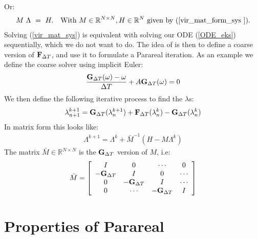 Or:
\begin{align}
M \ \Lambda \ = \ H.\quad \textrm{With $M\in\mathbb{R}^{N\times N},H\in\mathbb{R}^N$ given by (\ref{vir_mat_form_sys }).} \label{vir_mat_sys}
\end{align}
Solving (\ref{vir_mat_sys}) is equivalent with solving our ODE (\ref{ODE_eks}) sequentially, which we do not want to do. The idea of \cite{maday2002parareal} is then to define a coarse version of $\bold{F}_{\Delta T}$, and use it to formulate a Parareal iteration. As an example we define the coarse solver using implicit Euler:
 \begin{align}
\frac{\bold{G}_{\Delta T}(\omega) -\omega }{\Delta T } + A \bold{G}_{\Delta T}(\omega) = 0
\end{align}  
We then define the following iterative process to find the $\lambda$s:
\begin{align}
\lambda_{n+1}^{k+1} = \bold{G}_{\Delta T}(\lambda_{n}^{k+1}) + \bold{F}_{\Delta T}(\lambda_{n}^{k})-\bold{G}_{\Delta T}(\lambda_{n}^{k})
\end{align} 
In matrix form this looks like:
\begin{align}
\Lambda^{k+1} = \Lambda^k + \bar{M}^{-1}(H-M\Lambda^k) \label{matrix_iter1}
\end{align}
The matrix $\bar{M}\in\mathbb{R}^{N\times N}$ is the $\bold{G}_{\Delta T}$ version of $M$, i.e:
\begin{align}
\bar{M} = \left[ \begin{array}{cccc}
   I & 0 & \cdots & 0 \\  
   -\bold{G}_{\Delta T} & I & 0 & \cdots \\ 
   0 &-\bold{G}_{\Delta T} & I  & \cdots \\
   0 &\cdots &-\bold{G}_{\Delta T} & I   \\
   \end{array}  \right]
\end{align}
\section{Properties of Parareal}
